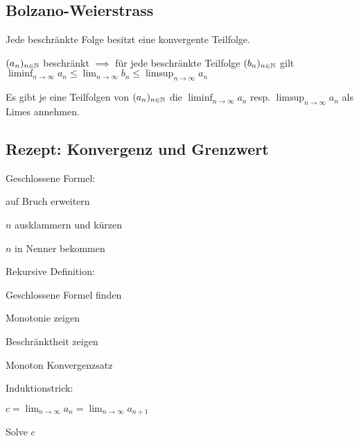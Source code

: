 \subsection{Bolzano-Weierstrass}
Jede beschränkte Folge besitzt eine konvergente Teilfolge.
\begin{compactitem}
    \item $(a_n)_{n \in \mathbb{N}}$ beschränkt $\implies$ für jede beschränkte Teilfolge $(b_n)_{n \in \mathbb{N}}$ gilt $\liminf_{n \to \infty} a_n \le \lim_{n \to \infty} b_n \le  \limsup_{n \to \infty} a_n$
    \item Es gibt je eine Teilfolgen von $(a_n)_{n \in \mathbb{N}}$ die $\liminf_{n \to \infty} a_n$ resp. $\limsup_{n \to \infty} a_n$ als Limes annehmen.
\end{compactitem}

\subsection{Rezept: Konvergenz und Grenzwert}
\begin{compactdesc}
    \item[Geschlossene Formel:]
        \begin{inparaitem}
            \item auf Bruch erweitern
            \item $n$ ausklammern und kürzen
            \item $n$ in Nenner bekommen
        \end{inparaitem}
    \item[Rekursive Definition:]
        \begin{inparaitem}
            \item Geschlossene Formel finden
            \item
                \begin{inparaenum}
                    \item Monotonie zeigen
                    \item Beschränktheit zeigen
                    \item Monoton Konvergenzsatz
                    \item Induktionstrick:
                        \begin{inparaitem}
                            \item $c = \lim_{n \to \infty} a_n = \lim_{n \to \infty} a_{n+1}$
                            \item Solve $c$
                        \end{inparaitem}
                \end{inparaenum}
        \end{inparaitem}
\end{compactdesc}

